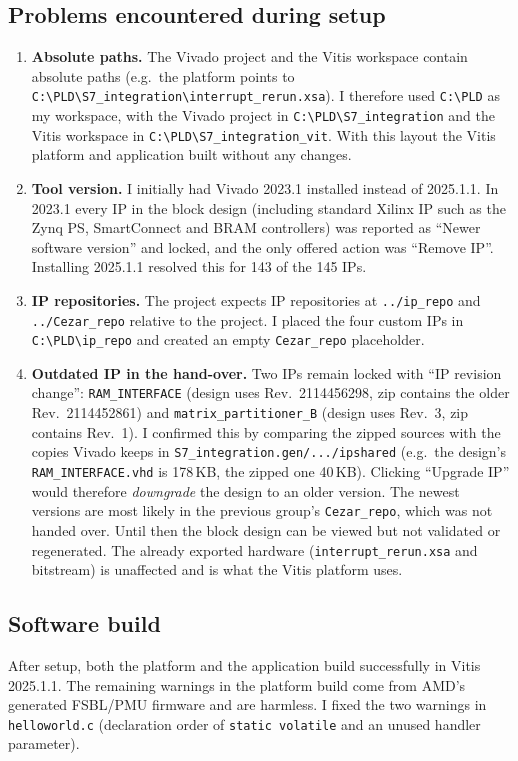 \documentclass[11pt,a4paper]{article}
\newcommand{\code}[1]{\texttt{#1}}
\begin{document}
\subsection{Problems encountered during setup}
\begin{enumerate}
  \item \textbf{Absolute paths.} The Vivado project and the Vitis workspace contain absolute paths (e.g.\ the platform points to \code{C:\textbackslash PLD\textbackslash S7\_integration\textbackslash interrupt\_rerun.xsa}). I therefore used \code{C:\textbackslash PLD} as my workspace, with the Vivado project in \code{C:\textbackslash PLD\textbackslash S7\_integration} and the Vitis workspace in \code{C:\textbackslash PLD\textbackslash S7\_integration\_vit}. With this layout the Vitis platform and application built without any changes.
  \item \textbf{Tool version.} I initially had Vivado 2023.1 installed instead of 2025.1.1. In 2023.1 every IP in the block design (including standard Xilinx IP such as the Zynq PS, SmartConnect and BRAM controllers) was reported as ``Newer software version'' and locked, and the only offered action was ``Remove IP''. Installing 2025.1.1 resolved this for 143 of the 145 IPs.
  \item \textbf{IP repositories.} The project expects IP repositories at \code{../ip\_repo} and \code{../Cezar\_repo} relative to the project. I placed the four custom IPs in \code{C:\textbackslash PLD\textbackslash ip\_repo} and created an empty \code{Cezar\_repo} placeholder.
  \item \textbf{Outdated IP in the hand-over.} Two IPs remain locked with ``IP revision change'': \code{RAM\_INTERFACE} (design uses Rev.~2114456298, zip contains the older Rev.~2114452861) and \code{matrix\_partitioner\_B} (design uses Rev.~3, zip contains Rev.~1). I confirmed this by comparing the zipped sources with the copies Vivado keeps in \code{S7\_integration.gen/.../ipshared} (e.g.\ the design's \code{RAM\_INTERFACE.vhd} is 178\,KB, the zipped one 40\,KB). Clicking ``Upgrade IP'' would therefore \emph{downgrade} the design to an older version. The newest versions are most likely in the previous group's \code{Cezar\_repo}, which was not handed over. Until then the block design can be viewed but not validated or regenerated. The already exported hardware (\code{interrupt\_rerun.xsa} and bitstream) is unaffected and is what the Vitis platform uses.
\end{enumerate}

\subsection{Software build}
After setup, both the platform and the application build successfully in Vitis 2025.1.1. The remaining warnings in the platform build come from AMD's generated FSBL/PMU firmware and are harmless. I fixed the two warnings in \code{helloworld.c} (declaration order of \code{static volatile} and an unused handler parameter).
\end{document}
